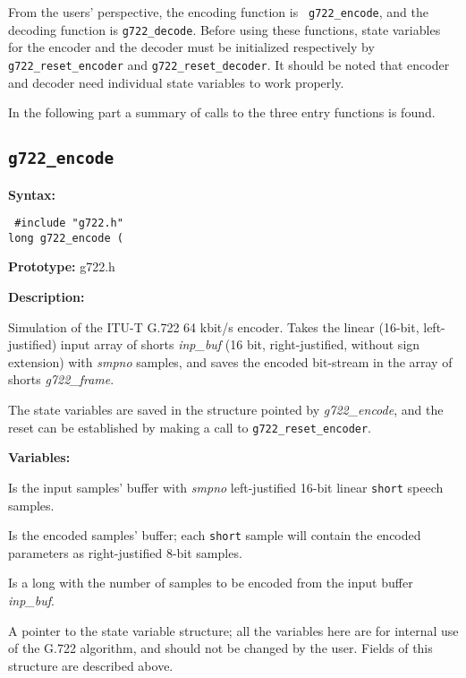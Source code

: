 From the users' perspective, the encoding function is {\tt
g722\_encode}, and the decoding function is {\tt g722\_decode}.
Before using these functions, state variables for the encoder and the
decoder must be initialized respectively by {\tt g722\_reset\_encoder}
and {\tt g722\_reset\_decoder}. It should be noted that encoder and
decoder need individual state variables to work properly.

In the following part a summary of calls to the three entry functions
is found.

\subsection{{\tt g722\_encode}}

{\bf Syntax: }

{\tt
\#include "g722.h"\\
long g722\_encode (
}

{\bf Prototype: }    g722.h

{\bf Description: }

        Simulation of the ITU-T G.722 64 kbit/s encoder. Takes
        the linear (16-bit, left-justified) input array
        of shorts {\em inp\_buf} (16 bit,
        right-justified, without sign extension) with {\em smpno}
        samples, and saves the encoded bit-stream in the array of shorts
        {\em g722\_frame}. 

        The state variables are saved in the structure pointed by {\em
        g722\_encode}, and the reset can be established by making a
        call to {\tt g722\_reset\_encoder}.

{\bf Variables: }
\begin{Descr}{\DescrLen}
\item[\pbox{20mm}{\em inp\_buf}] %
               Is the input samples' buffer with {\em smpno}
               left-justified 16-bit linear {\tt short} speech samples.

\item[\pbox{20mm}{\em g722\_frame}] %
               Is the encoded samples' buffer; each {\tt short} sample
               will contain the encoded parameters as right-justified
               8-bit samples.

\item[\pbox{20mm}{\em smpno}] %
               Is a long with the number of samples to be encoded from
               the input buffer {\em inp\_buf}.

\item[\pbox{20mm}{\em g722\_encode}] %
               A pointer to the state variable structure; all the variables
               here are for
               internal use of the G.722 algorithm, and should not be
               changed by the user. Fields of this structure are described
               above.
\end{Descr}

